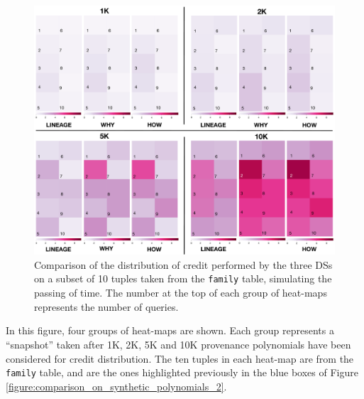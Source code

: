 \begin{figure}[t]
  \includegraphics[width=\textwidth]{figures/experiments/comparison}
  \caption{Comparison of the distribution of credit performed by the three DSs on a subset of 10 tuples taken from the \texttt{family} table, simulating the passing of time. The number at the top of each group of heat-maps represents the number of queries.}
  \label{fig:comparison}
\end{figure}


In this figure, four groups of heat-maps are shown. Each group represents a ``snapshot'' taken %
after 1K, 2K, 5K and 10K provenance polynomials have been considered for credit distribution.  
The ten tuples in each heat-map are from the \texttt{family} table, and are the ones highlighted previously in the blue boxes of Figure \ref{figure:comparison_on_synthetic_polynomials_2}.  



